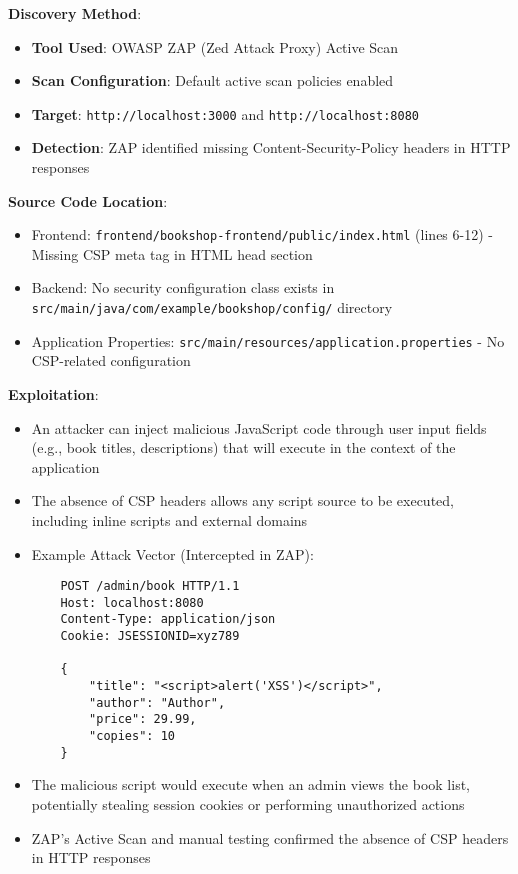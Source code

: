 \documentclass[]{UCD_CS_FYP_Report}
\begin{document}
\textbf{Discovery Method}: 
\begin{itemize}
    \item \textbf{Tool Used}: OWASP ZAP (Zed Attack Proxy) Active Scan
    \item \textbf{Scan Configuration}: Default active scan policies enabled
    \item \textbf{Target}: \texttt{http://localhost:3000} and \texttt{http://localhost:8080}
    \item \textbf{Detection}: ZAP identified missing Content-Security-Policy headers in HTTP responses
\end{itemize}

\textbf{Source Code Location}: 
\begin{itemize}
    \item Frontend: \texttt{frontend/bookshop-frontend/public/index.html} (lines 6-12) - Missing CSP meta tag in HTML head section
    \item Backend: No security configuration class exists in \texttt{src/main/java/com/example/bookshop/config/} directory
    \item Application Properties: \texttt{src/main/resources/application.properties} - No CSP-related configuration
\end{itemize}

\textbf{Exploitation}:
\begin{itemize}
    \item An attacker can inject malicious JavaScript code through user input fields (e.g., book titles, descriptions) that will execute in the context of the application
    \item The absence of CSP headers allows any script source to be executed, including inline scripts and external domains
    \item Example Attack Vector (Intercepted in ZAP):
    \begin{verbatim}
    POST /admin/book HTTP/1.1
    Host: localhost:8080
    Content-Type: application/json
    Cookie: JSESSIONID=xyz789
    
    {
        "title": "<script>alert('XSS')</script>",
        "author": "Author",
        "price": 29.99,
        "copies": 10
    }
    \end{verbatim}
    \item The malicious script would execute when an admin views the book list, potentially stealing session cookies or performing unauthorized actions
    \item ZAP's Active Scan and manual testing confirmed the absence of CSP headers in HTTP responses
\end{itemize}
\end{document}
